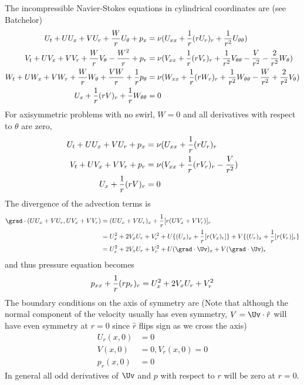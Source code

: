 The incompressible Navier-Stokes equations in cylindrical coordinates are (see Batchelor)
\begin{align*}
  U_t + U U_x + V U_r + {W \over r} U_\theta + p_x & = \nu( U_{xx} + {1\over r}( r U_r)_r +
         {1\over r^2} U_{\theta\theta} ) \\
  V_t + U V_x + V V_r + {W \over r} V_\theta -{ W^2\over r}  + p_r & = 
         \nu( V_{xx} + {1\over r}( r V_r)_r +
         {1\over r^2} V_{\theta\theta} - {V\over r^2} - {2\over r^2} W_\theta ) \\
  W_t + U W_x + V W_r + {W \over r} W_\theta + {V W \over r} + {1\over r}p_\theta 
     & = \nu( W_{xx} + {1\over r}( r  W_r)_r +
         {1\over r^2} W_{\theta\theta} -{W\over r^2} + {2\over r^2} V_\theta ) \\
  U_x + {1\over r}(r V)_r + {1\over r} W_{\theta\theta} &=0
\end{align*}
For axisymmetric problems with no swirl,  $W=0$ and all derivatives with respect to $\theta$ are zero,
\begin{align}
  U_t + U U_x + V U_r + p_x & = \nu( U_{xx} + {1\over r}( r U_r)_r \\
  V_t + U V_x + V V_r + p_r & = \nu( V_{xx} + {1\over r}( r V_r)_r - {V\over r^2} )\\
  U_x + {1\over r}(r V)_r  &=0  \label{divAxisymmetric} 
\end{align}
The divergence of the advection terms is
\begin{align*}
\grad\cdot (  U U_x + V U_r,  U V_x + V V_r ) &= (U U_x + V U_r)_x +{1\over r}[r( U V_x + V V_r)]_r \\
             &= U_x^2 +2 V_x U_r + V_r^2 + U\{ (U_x)_x +{1\over r}[r( V_x )_r]  \}
                + V\{ (U_r)_x +{1\over r}[r(V_r)]_r \} \\
             &= U_x^2 +2 V_x U_r + V_r^2 + U (\grad\cdot\Uv)_x + V (\grad\cdot\Uv)_r 
\end{align*}
and thus pressure equation becomes
\[
  p_{xx} + {1\over r}( r p_r)_r = U_x^2 + 2 V_x U_r + V_r^2
\]
The boundary conditions on the axis of symmetry are (Note that although the normal component of the 
velocity usually has even symmetry, $V = \Uv\cdot\hat{r}$ will have even symmetry at $r=0$ since $\hat{r}$ flips sign as we 
cross the axis)
\begin{align*}
   U_r(x,0)&=0  \\
  V(x,0) &=0 \comma V_{r}(x,0) = 0 \\
  p_r(x,0) &= 0 
\end{align*}
In general all odd derivatives of $\Uv$ and $p$ with respect to $r$ will be zero at $r=0$.


